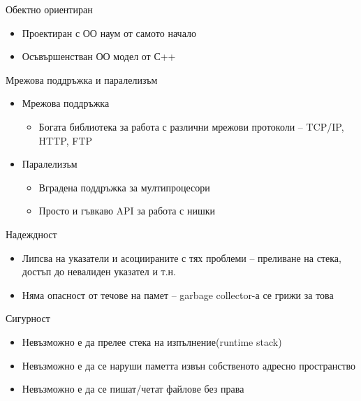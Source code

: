 \documentclass{beamer}
\begin{document}
\begin{frame}{Обектно ориентиран}
  \transdissolve
  \begin{itemize}
  \item Проектиран с ОО наум от самото начало
  \item Осъвършенстван ОО модел от С++
  \end{itemize}
\end{frame}


\begin{frame}{Мрежова поддръжка и паралелизъм}
  \transdissolve
  \begin{itemize}
    \item Мрежова поддръжка
  \begin{itemize}
  \item   Богата библиотека за работа с различни
    мрежови протоколи – TCP/IP, HTTP, FTP

  \end{itemize}
  \item Паралелизъм
    
    \begin{itemize}
    \item  Вградена поддръжка за мултипроцесори
    \item Просто и гъвкаво API за работа с нишки

    \end{itemize}

  \end{itemize}

\end{frame}


\begin{frame}{Надеждност}
  \transdissolve
  \begin{itemize}
    \item Липсва на указатели и асоциираните с
    тях проблеми – преливане на стека,
    достъп до невалиден указател и т.н.

    \item Няма опасност от течове на памет –
    garbage collector-а се грижи за това

  \end{itemize}

\end{frame}


\begin{frame}{Сигурност}
  \transdissolve  
  \begin{itemize}
   \item Невъзможно е да прелее стека на
    изпълнение(runtime stack)
   \item Невъзможно е да се наруши паметта
    извън собственото адресно
    пространство
   \item Невъзможно е да се пишат/четат
    файлове без права

  \end{itemize}

\end{frame}
\end{document}
